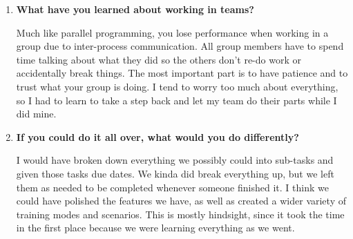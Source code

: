 \documentclass[onecolumn, draftclsnofoot,10pt, compsoc]{IEEEtran}
\begin{document}
\begin{enumerate}
    \item \textbf{What have you learned about working in teams?}
    
    Much like parallel programming, you lose performance when working in a group due to inter-process communication. All group members have to spend time talking about what they did so the others don't re-do work or accidentally break things. The most important part is to have patience and to trust what your group is doing. I tend to worry too much about everything, so I had to learn to take a step back and let my team do their parts while I did mine.
    
    \item \textbf{If you could do it all over, what would you do differently?}
    
    I would have broken down everything we possibly could into sub-tasks and given those tasks due dates. We kinda did break everything up, but we left them as needed to be completed whenever someone finished it. I think we could have polished the features we have, as well as created a wider variety of training modes and scenarios. This is mostly hindsight, since it took the time in the first place because we were learning everything as we went.
    
\end{enumerate}
\end{document}
